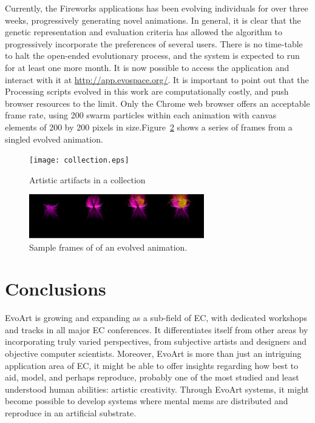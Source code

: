 \documentclass{sig-alternate}
\begin{document}
Currently, the Fireworks applications has been
evolving individuals for over three weeks, progressively generating
novel animations. In general, it is clear that the genetic
representation and evaluation criteria has allowed the algorithm
to progressively incorporate the preferences of several users.
There is no time-table to halt the open-ended evolutionary
process, and the system is expected to run for at least one
more month. It is now possible to access the application and
interact with it at \url{http://app.evospace.org/}. It is important to
point out that the Processing scripts evolved in this work
are computationally costly, and push browser resources to the
limit. Only the Chrome web browser offers an acceptable
frame rate, using 200 swarm particles within each animation
with canvas elements of 200 by 200 pixels in size.Figure~\ref{fig:fireworks}
shows a series of frames from a singled evolved animation.
\begin{figure}[t]
    \centering
        \texttt{[image: collection.eps]}
    \caption{Artistic artifacts in a collection }
    \label{fig:collection}
\end{figure}


\begin{figure}[t]
    \centering
        \includegraphics[width=3in]{fireworks.eps}
    \caption{Sample frames of of an evolved animation. }
    \label{fig:fireworks}
\end{figure}

\section{Conclusions}
EvoArt is growing and expanding as a sub-field of EC, with dedicated workshops and tracks in all major EC conferences.
It differentiates itself from other areas by incorporating truly varied perspectives, from subjective artists and designers and objective
computer scientists.
Moreover, EvoArt is more than just an intriguing application area of EC, it might be able to offer insights regarding how best to aid, model, and perhaps reproduce,
probably one of the most studied and least understood human abilities: artistic creativity.
Through EvoArt systems, it might become possible to develop systems where mental mems are distributed and reproduce in an artificial substrate.
\end{document}
